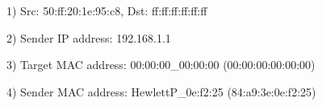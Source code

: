 \documentclass[a4paper,11pt]{article}
\begin{document}
\begin{center}
\label{fig:image}
\end{center}
1) Src: 50:ff:20:1e:95:c8, Dst: ff:ff:ff:ff:ff:ff

\begin{center}
\label{fig:image}
\end{center}
2) Sender IP address: 192.168.1.1

3) Target MAC address: 00:00:00\_00:00:00 (00:00:00:00:00:00) 

\begin{center}
\label{fig:image}
\end{center}
4) Sender MAC address: HewlettP\_0e:f2:25 (84:a9:3e:0e:f2:25)
\end{document}
